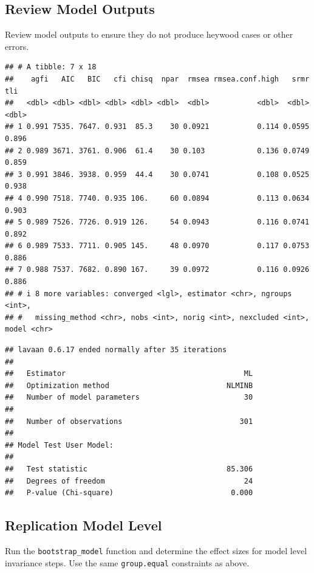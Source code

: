 \documentclass[
  man]{apa7}
\begin{document}
\hypertarget{review-model-outputs}{%
\subsection{Review Model Outputs}\label{review-model-outputs}}

Review model outputs to ensure they do not produce heywood cases or other errors.

\begin{verbatim}
## # A tibble: 7 x 18
##    agfi   AIC   BIC   cfi chisq  npar  rmsea rmsea.conf.high   srmr   tli
##   <dbl> <dbl> <dbl> <dbl> <dbl> <dbl>  <dbl>           <dbl>  <dbl> <dbl>
## 1 0.991 7535. 7647. 0.931  85.3    30 0.0921           0.114 0.0595 0.896
## 2 0.989 3671. 3761. 0.906  61.4    30 0.103            0.136 0.0749 0.859
## 3 0.991 3846. 3938. 0.959  44.4    30 0.0741           0.108 0.0525 0.938
## 4 0.990 7518. 7740. 0.935 106.     60 0.0894           0.113 0.0634 0.903
## 5 0.989 7526. 7726. 0.919 126.     54 0.0943           0.116 0.0741 0.892
## 6 0.989 7533. 7711. 0.905 145.     48 0.0970           0.117 0.0753 0.886
## 7 0.988 7537. 7682. 0.890 167.     39 0.0972           0.116 0.0926 0.886
## # i 8 more variables: converged <lgl>, estimator <chr>, ngroups <int>,
## #   missing_method <chr>, nobs <int>, norig <int>, nexcluded <int>, model <chr>
\end{verbatim}

\begin{verbatim}
## lavaan 0.6.17 ended normally after 35 iterations
## 
##   Estimator                                         ML
##   Optimization method                           NLMINB
##   Number of model parameters                        30
## 
##   Number of observations                           301
## 
## Model Test User Model:
##                                                       
##   Test statistic                                85.306
##   Degrees of freedom                                24
##   P-value (Chi-square)                           0.000
\end{verbatim}

\hypertarget{replication-model-level}{%
\subsection{Replication Model Level}\label{replication-model-level}}

Run the \texttt{bootstrap\_model} function and determine the effect sizes for model level invariance steps. Use the same \texttt{group.equal} constraints as above.
\end{document}
